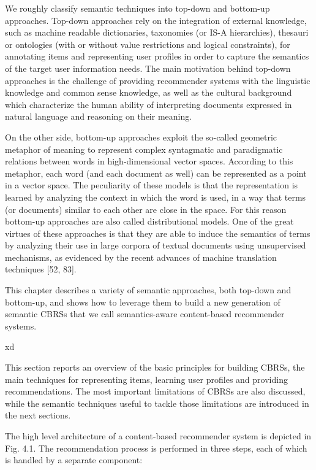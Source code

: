 We roughly classify semantic techniques into top-down and bottom-up approaches. Top-down approaches rely on the integration of external knowledge, such as machine readable dictionaries, taxonomies (or IS-A hierarchies), thesauri or ontologies (with or without value restrictions and logical constraints), for annotating items and representing user profiles in order to capture the semantics of the target user information needs. The main motivation behind top-down approaches is the challenge of providing recommender systems with the linguistic knowledge and common sense knowledge, as well as the cultural background which characterize the human ability of interpreting documents expressed in natural language and reasoning on their meaning.

On the other side, bottom-up approaches exploit the so-called geometric metaphor of meaning to represent complex syntagmatic and paradigmatic relations between words in high-dimensional vector spaces. According to this metaphor, each word (and each document as well) can be represented as a point in a vector space. The peculiarity of these models is that the representation is learned by analyzing the context in which the word is used, in a way that terms (or documents) similar to each other are close in the space. For this reason bottom-up approaches are also called distributional models. One of the great virtues of these approaches is that they are able to induce the semantics of terms by analyzing their use in large corpora of textual documents using unsupervised mechanisms, as evidenced by the recent advances of machine translation techniques [52, 83].

This chapter describes a variety of semantic approaches, both top-down and bottom-up, and shows how to leverage them to build a new generation of semantic CBRSs that we call semantics-aware content-based recommender systems.

xd

This section reports an overview of the basic principles for building CBRSs, the main techniques for representing items, learning user profiles and providing recommendations. The most important limitations of CBRSs are also discussed, while the semantic techniques useful to tackle those limitations are introduced in the next sections.

The high level architecture of a content-based recommender system is depicted in Fig. 4.1. The recommendation process is performed in three steps, each of which is handled by a separate component:

